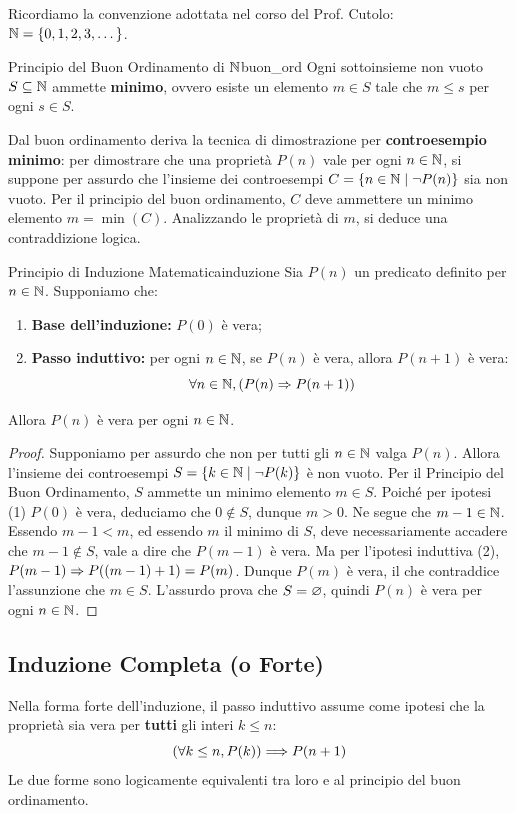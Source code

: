 Ricordiamo la convenzione adottata nel corso del Prof. Cutolo: $\mathbb{N} = \{0, 1, 2, 3, \dots\}$.

\begin{teorema}{Principio del Buon Ordinamento di $\mathbb{N}$}{buon_ord}
Ogni sottoinsieme non vuoto $S \subseteq \mathbb{N}$ ammette \textbf{minimo}, ovvero esiste un elemento $m \in S$ tale che $m \le s$ per ogni $s \in S$.
\end{teorema}

Dal buon ordinamento deriva la tecnica di dimostrazione per \textbf{controesempio minimo}: per dimostrare che una proprietà $P(n)$ vale per ogni $n \in \mathbb{N}$, si suppone per assurdo che l'insieme dei controesempi $C = \{n \in \mathbb{N} \mid \neg P(n)\}$ sia non vuoto. Per il principio del buon ordinamento, $C$ deve ammettere un minimo elemento $m = \min(C)$. Analizzando le proprietà di $m$, si deduce una contraddizione logica.

\begin{teorema}{Principio di Induzione Matematica}{induzione}
Sia $P(n)$ un predicato definito per $n \in \mathbb{N}$. Supponiamo che:
\begin{enumerate}
    \item \textbf{Base dell'induzione:} $P(0)$ è vera;
    \item \textbf{Passo induttivo:} per ogni $n \in \mathbb{N}$, se $P(n)$ è vera, allora $P(n+1)$ è vera:
    \[
        \forall n \in \mathbb{N}, (P(n) \Rightarrow P(n+1))
    \]
\end{enumerate}
Allora $P(n)$ è vera per ogni $n \in \mathbb{N}$.
\end{teorema}

\begin{proof}
Supponiamo per assurdo che non per tutti gli $n \in \mathbb{N}$ valga $P(n)$. Allora l'insieme dei controesempi $S = \{k \in \mathbb{N} \mid \neg P(k)\}$ è non vuoto. Per il Principio del Buon Ordinamento, $S$ ammette un minimo elemento $m \in S$.
Poiché per ipotesi (1) $P(0)$ è vera, deduciamo che $0 \notin S$, dunque $m > 0$. Ne segue che $m - 1 \in \mathbb{N}$.
Essendo $m - 1 < m$, ed essendo $m$ il minimo di $S$, deve necessariamente accadere che $m - 1 \notin S$, vale a dire che $P(m-1)$ è vera.
Ma per l'ipotesi induttiva (2), $P(m-1) \Rightarrow P((m-1)+1) = P(m)$. Dunque $P(m)$ è vera, il che contraddice l'assunzione che $m \in S$.
L'assurdo prova che $S = \varnothing$, quindi $P(n)$ è vera per ogni $n \in \mathbb{N}$.
\end{proof}

\subsection{Induzione Completa (o Forte)}
Nella forma forte dell'induzione, il passo induttivo assume come ipotesi che la proprietà sia vera per \textbf{tutti} gli interi $k \le n$:
\[
    (\forall k \le n, P(k)) \Longrightarrow P(n+1)
\]
Le due forme sono logicamente equivalenti tra loro e al principio del buon ordinamento.


